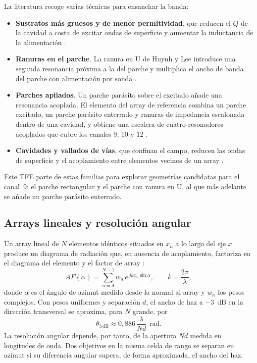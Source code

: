 \documentclass[11pt,a4paper]{article}
\begin{document}
La literatura recoge varias técnicas para ensanchar la banda:
\begin{itemize}
    \item \textbf{Sustratos más gruesos y de menor permitividad}, que reducen el $Q$ de la
    cavidad a costa de excitar ondas de superficie y aumentar la inductancia de la alimentación
    \cite{balanis2016antenna}.
    \item \textbf{Ranuras en el parche}. La ranura en U de Huynh y Lee introduce una segunda
    resonancia próxima a la del parche y multiplica el ancho de banda del parche con
    alimentación por sonda \cite{huynh1995uslot}.
    \item \textbf{Parches apilados}. Un parche parásito sobre el excitado añade una resonancia
    acoplada. El elemento del array de referencia combina un parche excitado, un parche parásito
    enterrado y ranuras de impedancia escalonada dentro de una cavidad, y obtiene una escalera de
    cuatro resonadores acoplados que cubre los canales 9, 10 y 12 \cite{carretero2027vpa}.
    \item \textbf{Cavidades y vallados de vías}, que confinan el campo, reducen las ondas de
    superficie y el acoplamiento entre elementos vecinos de un array \cite{carretero2027vpa}.
\end{itemize}
Este TFE parte de estas familias para explorar geometrías candidatas para el canal~9: el parche
rectangular y el parche con ranura en U, al que más adelante se añade un parche parásito enterrado.

\subsection{Arrays lineales y resolución angular}\label{sec:arrays}
Un array lineal de $N$ elementos idénticos situados en $x_n$ a lo largo del eje $x$ produce un
diagrama de radiación que, en ausencia de acoplamiento, factoriza en el diagrama del elemento y
el factor de array \cite{balanis2016antenna, vantrees2002array}:
\begin{equation}
    AF(\alpha) = \sum_{n=0}^{N-1} w_n\, e^{\,j k x_n \sin\alpha},
    \qquad k = \frac{2\pi}{\lambda},
    \label{eq:factor_array}
\end{equation}
donde $\alpha$ es el ángulo de azimut medido desde la normal al array y $w_n$ los pesos
complejos. Con pesos uniformes y separación $d$, el ancho de haz a \SI{-3}{dB} en la dirección
transversal se aproxima, para $N$ grande, por
\begin{equation}
    \theta_{3\,\mathrm{dB}} \approx 0{,}886\,\frac{\lambda}{N d}\ \ \mathrm{rad}.
    \label{eq:ancho_haz}
\end{equation}
La resolución angular depende, por tanto, de la apertura $Nd$ medida en longitudes de onda. Dos
objetivos en la misma celda de rango se separan en azimut si su diferencia angular supera, de
forma aproximada, el ancho del haz.
\end{document}
